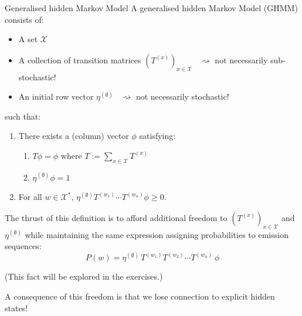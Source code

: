 \documentclass[aspectratio=169,11pt]{beamer}
\begin{document}
\begin{frame}{Generalised hidden Markov Model}
  \vspace{0.2em}
  A generalised hidden Markov Model (GHMM) consists of:
  \vspace{0.4em}
  \begin{itemize}
    \item[\textasteriskcentered] A set $\mathcal{X}$
    \vspace{0.2em}
    \item[\textasteriskcentered] A collection of transition matrices
          $(T^{(x)})_{x\in\mathcal{X}}$
          \ {\color{blue}\small $\rightsquigarrow$ not necessarily sub-stochastic!}
    \vspace{0.2em}
    \item[\textasteriskcentered] An initial row vector $\eta^{(\emptyset)}$
          \ {\color{blue}\small $\rightsquigarrow$ not necessarily stochastic!}
  \end{itemize}
  \vspace{0.3em}
  such that:
  \vspace{0.3em}
  \begin{enumerate}
    \item There exists a (column) vector $\phi$ satisfying:
      \vspace{0.2em}
      \begin{enumerate}
        \item[a)] $T\phi = \phi$ \quad where \quad
                  $\displaystyle T := \sum_{x\in\mathcal{X}} T^{(x)}$
        \vspace{0.3em}
        \item[b)] $\eta^{(\emptyset)}\phi = 1$
      \end{enumerate}
    \vspace{0.4em}
    \item For all $w \in \mathcal{X}^{*}$, \quad
          $\eta^{(\emptyset)}T^{(w_1)}\!\cdots T^{(w_n)}\phi \geq 0$.
  \end{enumerate}
\end{frame}

\begin{frame}
  \vspace{0.6em}
  The thrust of this definition is to afford additional freedom to
  $(T^{(x)})_{x\in\mathcal{X}}$ and $\eta^{(\emptyset)}$ while maintaining
  the same expression assigning probabilities to emission sequences:
  \[
    P(w) = \eta^{(\emptyset)}\,T^{(w_1)}T^{(w_2)}\cdots T^{(w_n)}\,\phi
  \]
  \vspace{-0.2em}

  (This fact will be explored in the exercises.)
  \vspace{1.4em}

  A consequence of this freedom is that we lose connection to explicit
  hidden states!
\end{frame}
\end{document}
